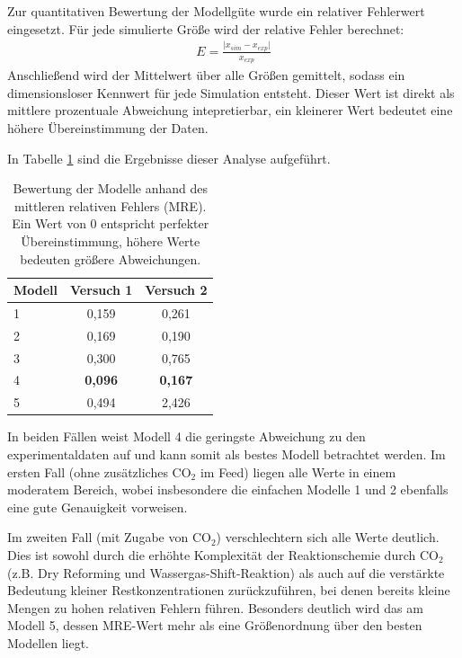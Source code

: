        Zur quantitativen Bewertung der Modellgüte wurde ein relativer Fehlerwert eingesetzt. Für jede simulierte Größe wird der relative Fehler berechnet:
        \begin{align}
            E = \frac{\vert x_{sim} - x_{exp}\vert}{x_{exp}} 
        \end{align}
        Anschließend wird der Mittelwert über alle Größen gemittelt, sodass ein dimensionsloser Kennwert für jede Simulation entsteht. Dieser Wert ist direkt als mittlere prozentuale Abweichung intepretierbar, ein kleinerer Wert bedeutet eine höhere Übereinstimmung der Daten. 

        In Tabelle \ref{tab:relativer_fehler_vergleich} sind die Ergebnisse dieser Analyse aufgeführt. 
        \begin{table}[H]
            \centering
            \begin{tabular}{lcc}
                \toprule
                \textbf{Modell} & \textbf{Versuch 1} & \textbf{Versuch 2} \\
                \midrule
                1 & 0,159 & 0,261 \\
                2 & 0,169 & 0,190 \\
                3 & 0,300 & 0,765 \\
                4 & \textbf{0,096} & \textbf{0,167} \\
                5 & 0,494 & 2,426 \\
                \bottomrule
            \end{tabular}
            \caption{Bewertung der Modelle anhand des mittleren relativen Fehlers (MRE). Ein Wert von 0 entspricht perfekter Übereinstimmung, höhere Werte bedeuten größere Abweichungen.}
            \label{tab:relativer_fehler_vergleich}
        \end{table}
        In beiden Fällen weist Modell 4 die geringste Abweichung zu den experimentaldaten auf und kann somit als bestes Modell betrachtet werden. Im ersten Fall (ohne zusätzliches CO$_2$ im Feed) liegen alle Werte in einem moderatem Bereich, wobei insbesondere die einfachen Modelle 1 und 2 ebenfalls eine gute Genauigkeit vorweisen. 


        Im zweiten Fall (mit Zugabe von CO$_2$) verschlechtern sich alle Werte deutlich. Dies ist sowohl durch die erhöhte Komplexität der Reaktionschemie durch CO$_2$ (z.B. Dry Reforming und Wassergas-Shift-Reaktion) als auch auf die verstärkte Bedeutung kleiner Restkonzentrationen zurückzuführen, bei denen bereits kleine Mengen zu hohen relativen Fehlern führen. Besonders deutlich wird das am Modell 5, dessen MRE-Wert mehr als eine Größenordnung über den besten Modellen liegt.

